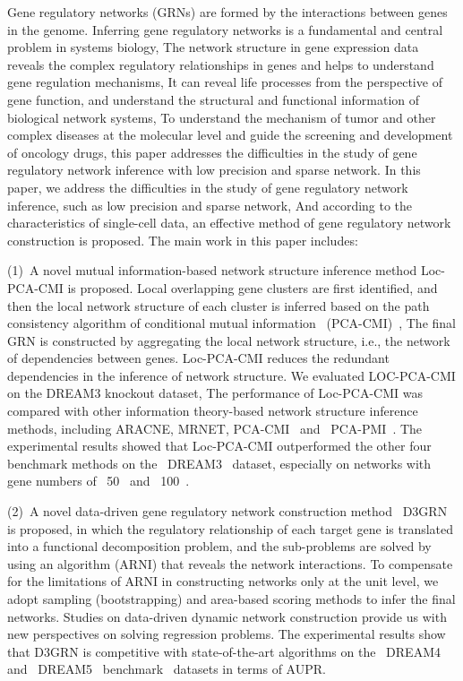\begin{abstracten}
Gene regulatory networks (GRNs) are formed by the interactions between genes in the genome.
Inferring gene regulatory networks is a fundamental and central problem in systems biology,
The network structure in gene expression data reveals the complex regulatory relationships in genes and helps to understand gene regulation mechanisms,
It can reveal life processes from the perspective of gene function, and understand the structural and functional information of biological network systems,
To understand the mechanism of tumor and other complex diseases at the molecular level and guide the screening and development of oncology drugs, this paper addresses the difficulties in the study of gene regulatory network inference with low precision and sparse network.
In this paper, we address the difficulties in the study of gene regulatory network inference, such as low precision and sparse network,
And according to the characteristics of single-cell data, an effective method of gene regulatory network construction is proposed.
The main work in this paper includes:

(1)~A novel mutual information-based network structure inference method Loc-PCA-CMI is proposed.
Local overlapping gene clusters are first identified, and then the local network structure of each cluster is inferred based on the path consistency algorithm of conditional mutual information ~(PCA-CMI)~,
The final GRN is constructed by aggregating the local network structure, i.e., the network of dependencies between genes.
Loc-PCA-CMI reduces the redundant dependencies in the inference of network structure.
We evaluated LOC-PCA-CMI on the DREAM3 knockout dataset,
The performance of Loc-PCA-CMI was compared with other information theory-based network structure inference methods, including ARACNE, MRNET, PCA-CMI~ and ~PCA-PMI~.
The experimental results showed that Loc-PCA-CMI outperformed the other four benchmark methods on the ~DREAM3~ dataset, especially on networks with gene numbers of ~50~ and ~100~.

(2)~A novel data-driven gene regulatory network construction method ~D3GRN is proposed, in which the regulatory relationship of each target gene is translated into a functional decomposition problem, 
and the sub-problems are solved by using an algorithm (ARNI) that reveals the network interactions. 
To compensate for the limitations of ARNI in constructing networks only at the unit level, 
we adopt sampling (bootstrapping) and area-based scoring methods to infer the final networks. 
Studies on data-driven dynamic network construction provide us with new perspectives on solving regression problems. 
The experimental results show that D3GRN is competitive with state-of-the-art algorithms on the ~DREAM4~ and ~DREAM5~ benchmark~ datasets in terms of AUPR.


\end{abstracten}

